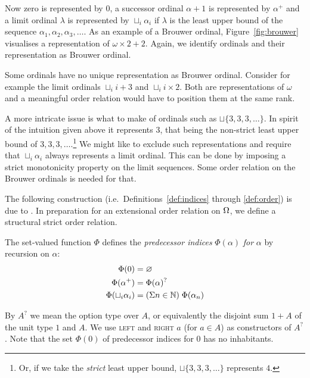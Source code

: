 Now zero is represented by $0$, a successor ordinal $\alpha +1$ is represented
by $\alpha^+$ and a limit ordinal $\lambda$ is represented by $\sqcup_i
\alpha_i$ if $\lambda$ is the least upper bound of the sequence $\alpha_1,
\alpha_2, \alpha_3, \ldots$. As an example of a Brouwer ordinal,
Figure~\ref{fig:brouwer} visualises a representation of $\omega \times
2 + 2$. Again, we identify ordinals and their representation as
Brouwer ordinal.

Some ordinals have no unique representation as Brouwer ordinal. Consider for
example the limit ordinals $\sqcup_i i + 3$ and $\sqcup_i i \times 2$. Both
are representations of $\omega$ and a meaningful order relation would
have to position them at the same rank.

A more intricate issue is what to make of ordinals such as $\sqcup \{
3, 3, 3, \ldots \}$. In spirit of the intuition given above it
represents $3$, that being the non-strict least upper bound of $3, 3,
3, \ldots$.\footnote{Or, if we take the \emph{strict} least upper bound, $\sqcup \{
3, 3, 3, \ldots \}$ represents $4$.}
We might like to exclude such representations and require that
$\sqcup_i \alpha_i$ always represents a limit ordinal. This can be
done by imposing a strict monotonicity property on the limit
sequences. Some order relation on the Brouwer ordinals is needed for
that.

The following construction (i.e.\ Definitions~\ref{def:indices}
through \ref{def:order}) is due to \citet{hancock-08}. In preparation
for an extensional order relation on $\Omega$, we define a structural
strict order relation.

\begin{definition}\label{def:indices}%
The set-valued function $\Phi$ defines the \emph{predecessor indices}
$\Phi(\alpha)$ \emph{for} $\alpha$ by recursion on $\alpha$:
\begin{align*}
  \Phi(0)                 &= \varnothing \\
  \Phi(\alpha^+)          &= \Phi(\alpha)^? \\
  \Phi(\sqcup_i \alpha_i) &= (\Sigma n \in \mathbb{N}) \; \Phi(\alpha_n)
\end{align*}
\end{definition}

By $A^?$ we mean the option type over $A$, or equivalently the
disjoint sum $1 + A$ of the unit type $1$ and $A$. We use
\textsc{left} and \textsc{right $a$} (for $a \in A$) as constructors
of $A^?$. Note that the set $\Phi(0)$ of predecessor indices for $0$
has no inhabitants.

